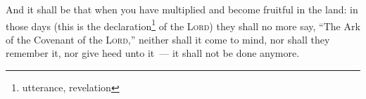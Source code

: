 


\begin{enumerate*}[mode=unboxed]
     And it shall be that when you have multiplied and become fruitful in the land: in those days (this is the declaration\footnote{utterance, revelation} of the \textsc{Lord}) they shall no more say, ``The Ark of the Covenant of the \textsc{Lord},'' neither shall it come to mind, nor shall they remember it, nor give heed unto it~--- it shall not be done anymore.%
\end{enumerate*}
